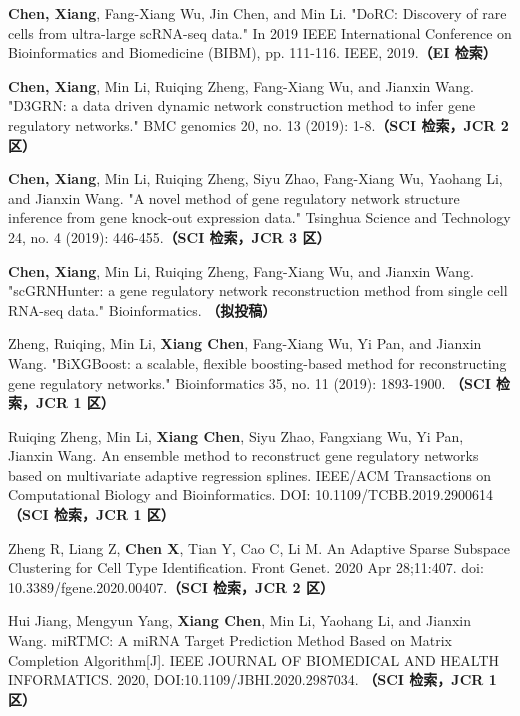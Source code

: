 \else
\begin{enumerate}[label={[\arabic*]},itemindent=2em,wide]


\item \textbf{Chen, Xiang}, Fang-Xiang Wu, Jin Chen, and Min Li. "DoRC: Discovery of rare cells from ultra-large scRNA-seq data." In 2019 IEEE International Conference on Bioinformatics and Biomedicine (BIBM), pp. 111-116. IEEE, 2019.{\bfseries \heiti（EI 检索）}
\item \textbf{Chen, Xiang}, Min Li, Ruiqing Zheng, Fang-Xiang Wu, and Jianxin Wang. "D3GRN: a data driven dynamic network construction method to infer gene regulatory networks." BMC genomics 20, no. 13 (2019): 1-8.{\bfseries \heiti（SCI 检索，JCR 2 区）} 
\item \textbf{Chen, Xiang}, Min Li, Ruiqing Zheng, Siyu Zhao, Fang-Xiang Wu, Yaohang Li, and Jianxin Wang. "A novel method of gene regulatory network structure inference from gene knock-out expression data." Tsinghua Science and Technology 24, no. 4 (2019): 446-455.{\bfseries \heiti（SCI 检索，JCR 3 区）} 
\item \textbf{Chen, Xiang}, Min Li, Ruiqing Zheng, Fang-Xiang Wu, and Jianxin Wang. "scGRNHunter: a gene regulatory network reconstruction method from single cell RNA-seq data." Bioinformatics. {\bfseries \heiti（拟投稿）}
\item Zheng, Ruiqing, Min Li, \textbf{Xiang Chen}, Fang-Xiang Wu, Yi Pan, and Jianxin Wang. "BiXGBoost: a scalable, flexible boosting-based method for reconstructing gene regulatory networks." Bioinformatics 35, no. 11 (2019): 1893-1900. {\bfseries \heiti（SCI 检索，JCR 1 区）}
\item Ruiqing Zheng, Min Li, \textbf{Xiang Chen}, Siyu Zhao, Fangxiang Wu, Yi Pan, Jianxin Wang. An ensemble method to reconstruct gene regulatory networks based on multivariate adaptive regression splines. IEEE/ACM Transactions on Computational Biology and Bioinformatics. DOI: 10.1109/TCBB.2019.2900614  {\bfseries \heiti（SCI 检索，JCR 1 区）}
\item Zheng R, Liang Z, \textbf{Chen X}, Tian Y, Cao C, Li M. An Adaptive Sparse Subspace Clustering for Cell Type Identification. Front Genet. 2020 Apr 28;11:407. doi: 10.3389/fgene.2020.00407.{\bfseries \heiti（SCI 检索，JCR 2 区）}
\item Hui Jiang, Mengyun Yang, \textbf{Xiang Chen}, Min Li, Yaohang Li, and Jianxin Wang. miRTMC: A miRNA Target Prediction Method Based on Matrix Completion Algorithm[J]. IEEE JOURNAL OF BIOMEDICAL AND HEALTH INFORMATICS. 2020, DOI:10.1109/JBHI.2020.2987034. {\bfseries \heiti（SCI 检索，JCR 1 区）}

\end{enumerate}
\fi

